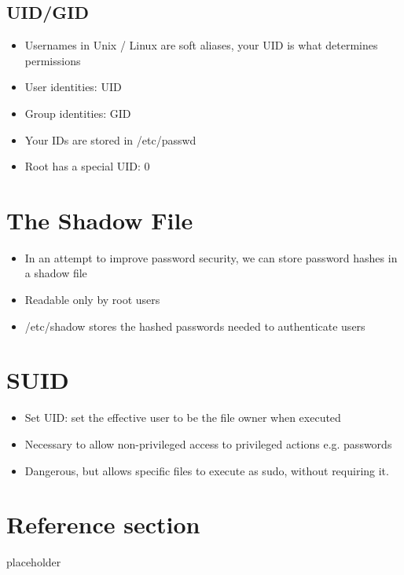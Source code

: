 \documentclass{article}
\begin{document}
\subsection{UID/GID}
\begin{itemize}
  \item Usernames in Unix / Linux are soft aliases, your UID is what determines permissions 
  \item User identities: UID 
  \item Group identities: GID 
  \item Your IDs are stored in /etc/passwd 
  \item Root has a special UID: 0
\end{itemize}

\section{The Shadow File}
\begin{itemize}
  \item In an attempt to improve password security, we can store password hashes in a shadow file 
  \item Readable only by root users 
  \item /etc/shadow stores the hashed passwords needed to authenticate users
\end{itemize}

\section{SUID}
\begin{itemize}
  \item Set UID: set the effective user to be the file owner when executed 
  \item Necessary to allow non-privileged access to privileged actions e.g. passwords 
  \item Dangerous, but allows specific files to execute as sudo, without requiring it.
\end{itemize}



\pagebreak
\section*{Reference section} \label{sec:reference}
\begin{description}
	\item[placeholder] \hfill \\
\end{description}
\end{document}

